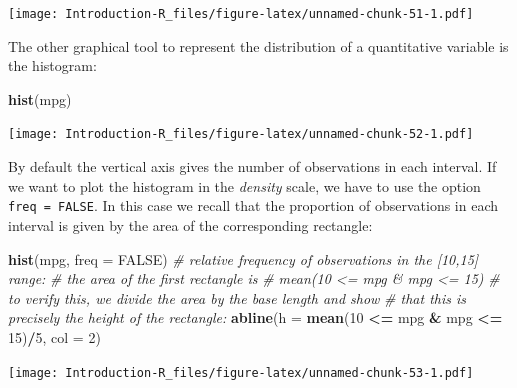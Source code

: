 \documentclass[]{book}
\newenvironment{Shaded}{\begin{snugshade}}{\end{snugshade}}
\newcommand{\CommentTok}[1]{\textcolor[rgb]{0.56,0.35,0.01}{\textit{#1}}}
\newcommand{\DataTypeTok}[1]{\textcolor[rgb]{0.13,0.29,0.53}{#1}}
\newcommand{\DecValTok}[1]{\textcolor[rgb]{0.00,0.00,0.81}{#1}}
\newcommand{\KeywordTok}[1]{\textcolor[rgb]{0.13,0.29,0.53}{\textbf{#1}}}
\newcommand{\NormalTok}[1]{#1}
\newcommand{\OperatorTok}[1]{\textcolor[rgb]{0.81,0.36,0.00}{\textbf{#1}}}
\newcommand{\OtherTok}[1]{\textcolor[rgb]{0.56,0.35,0.01}{#1}}
\newcommand{\StringTok}[1]{\textcolor[rgb]{0.31,0.60,0.02}{#1}}
\begin{document}
\texttt{[image: Introduction-R\_files/figure-latex/unnamed-chunk-51-1.pdf]}

The other graphical tool to represent the distribution of a quantitative variable is the histogram:

\begin{Shaded}
\begin{Highlighting}[]
\KeywordTok{hist}\NormalTok{(mpg)}
\end{Highlighting}
\end{Shaded}

\texttt{[image: Introduction-R\_files/figure-latex/unnamed-chunk-52-1.pdf]}

\begin{Shaded}
\end{Shaded}

By default the vertical axis gives the number of observations in each interval. If we want to plot the histogram in the \emph{density} scale, we have to use the option \texttt{freq\ =\ FALSE}. In this case we recall that the proportion of observations in each interval is given by the area of the corresponding rectangle:

\begin{Shaded}
\begin{Highlighting}[]
\KeywordTok{hist}\NormalTok{(mpg, }\DataTypeTok{freq =} \OtherTok{FALSE}\NormalTok{)}
\CommentTok{# relative frequency of observations in the [10,15] range:}
\CommentTok{# the area of the first rectangle is}
\CommentTok{# mean(10 <= mpg & mpg <= 15)}
\CommentTok{# to verify this, we divide the area by the base length and show}
\CommentTok{# that this is precisely the height of the rectangle:}
\KeywordTok{abline}\NormalTok{(}\DataTypeTok{h =} \KeywordTok{mean}\NormalTok{(}\DecValTok{10} \OperatorTok{<=}\StringTok{ }\NormalTok{mpg }\OperatorTok{&}\StringTok{ }\NormalTok{mpg }\OperatorTok{<=}\StringTok{ }\DecValTok{15}\NormalTok{)}\OperatorTok{/}\DecValTok{5}\NormalTok{, }\DataTypeTok{col =} \DecValTok{2}\NormalTok{)}
\end{Highlighting}
\end{Shaded}

\texttt{[image: Introduction-R\_files/figure-latex/unnamed-chunk-53-1.pdf]}
\end{document}
